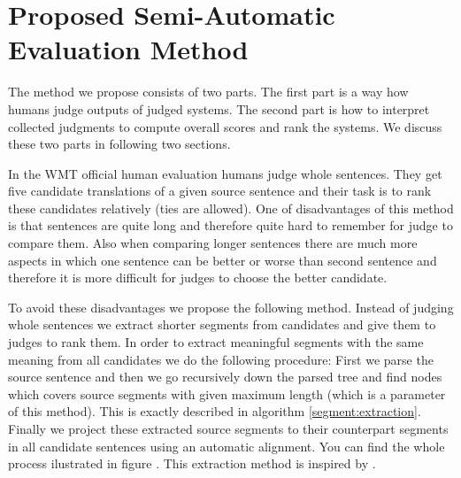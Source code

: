 \chapter{Proposed Semi-Automatic Evaluation Method}

The method we propose consists of two parts. The first part is a way how humans
judge outputs of judged systems. The second part is how to interpret collected
judgments to compute overall scores and rank the systems. We discuss these two
parts in following two sections. 

In the WMT official human evaluation humans judge whole sentences. They get
five candidate translations of a given source sentence and their task is to
rank these candidates relatively (ties are allowed). One of disadvantages of
this method is that sentences are quite long and therefore quite hard to
remember for judge to compare them. Also when comparing longer sentences there
are much more aspects in which one sentence can be better or worse than second
sentence and therefore it is more difficult for judges to choose the better
candidate. 


To avoid these disadvantages we propose the following method. Instead of
judging whole sentences we extract shorter segments from candidates and give
them to judges to rank them. In order to extract meaningful segments with the
same meaning from all candidates we do the following procedure: First we parse
the source sentence and then we go recursively down the parsed tree and find
nodes which covers source segments with given maximum length (which is a
parameter of this method). This is exactly described in algorithm
\ref{segment:extraction}. Finally we project these extracted source segments to
their counterpart segments in all candidate sentences using an automatic
alignment.  You can find the whole process ilustrated in figure .  This extraction method is inspired by .

